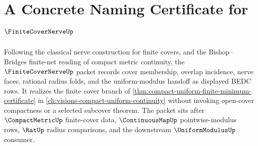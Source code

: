 \chapter{A Concrete Naming Certificate for $\FiniteCoverNerveUp$}
\label{ch:concrete-instances-finite-cover-nerve-namecert}

Following the classical nerve construction for finite covers, and the Bishop--Bridges finite-net reading of compact metric continuity, the $\FiniteCoverNerveUp$ packet records cover membership, overlap incidence, nerve faces, rational radius folds, and the uniform-modulus handoff as displayed BEDC rows. It realizes the finite cover branch of \autoref{thm:compact-uniform-finite-minimum-certificate} in \autoref{ch:visions-compact-uniform-continuity} without invoking open-cover compactness or a selected subcover theorem. The packet sits after $\CompactMetricUp$ finite-cover data, $\ContinuousMapUp$ pointwise-modulus rows, $\RatUp$ radius comparisons, and the downstream $\UniformModulusUp$ consumer.

